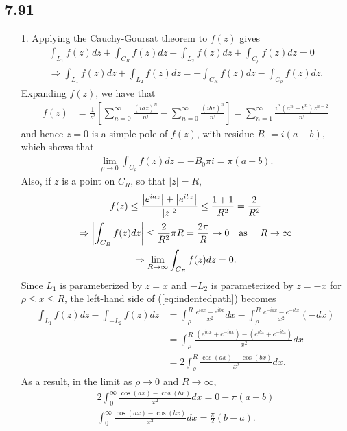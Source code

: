 \documentclass[a4paper,12pt]{article}
\begin{document}
\subsection*{7.91}
\begin{enumerate}
    \item[1.]
        Applying the Cauchy-Goursat theorem to $f(z)$ gives
        \begin{align}
            \int_{L_1} f(z) dz + \int_{C_R} f(z) dz + \int_{L_2} f(z) dz + \int_{C_\rho} f(z) dz = 0 \\
            \Rightarrow \int_{L_1} f(z) dz + \int_{L_2} f(z) dz = -\int_{C_R} f(z) dz - \int_{C_\rho} f(z) dz. \label{eq:indentedpath}
        \end{align}
        Expanding $f(z)$, we have that
        \begin{align*}
            f(z) &= \frac{1}{z^2} \left[ \sum_{n = 0}^\infty \frac{(iaz)^n}{n!} - \sum_{n = 0}^\infty \frac{(ibz)^n}{n!} \right] = \sum_{n = 1}^\infty \frac{i^n (a^n - b^n) z^{n - 2}}{n!}
        \end{align*}
        and hence $z = 0$ is a simple pole of $f(z)$, with residue $B_0 = i(a - b)$, which shows that
        \begin{align*}
            \lim_{\rho \to 0} \int_{C_\rho} f(z) dz = -B_0 \pi i = \pi(a - b).
        \end{align*}
        Also, if $z$ is a point on $C_R$, so that $|z| = R$,
        \begin{gather*}
            f(z) \leq \frac{\left| e^{iaz} \right| + \left| e^{ibz} \right|}{|z|^2} \leq \frac{1 + 1}{R^2} = \frac{2}{R^2} \\
            \Rightarrow \left| \int_{C_R} f(z) dz \right| \leq \frac{2}{R^2} \pi R = \frac{2 \pi}{R} \to 0 \text{\quad as \quad} R \to \infty \\
            \Rightarrow \lim_{R \to \infty} \int_{C_R} f(z) dz = 0.
        \end{gather*}
        Since $L_1$ is parameterized by $z = x$ and $-L_2$ is parameterized by $z = -x$ for $\rho \leq x \leq R$, the left-hand side of (\ref{eq:indentedpath}) becomes
        \begin{align*}
            \int_{L_1} f(z) dz - \int_{-L_2} f(z) dz &= \int_\rho^R \frac{e^{iax} - e^{ibx}}{x^2} dx - \int_\rho^R \frac{e^{-iax} - e^{-ibx}}{x^2} (-dx) \\
            &= \int_\rho^R \frac{\left( e^{iax} + e^{-iax} \right) - \left( e^{ibx} + e^{-ibx} \right)}{x^2} dx \\
            &= 2\int_\rho^R \frac{\cos(ax) - \cos(bx)}{x^2} dx.
        \end{align*}
        As a result, in the limit as $\rho \to 0$ and $R \to \infty$,
        \begin{gather*}
            2\int_0^\infty \frac{\cos(ax) - \cos(bx)}{x^2} dx = 0 - \pi(a - b) \\
            \int_0^\infty \frac{\cos(ax) - \cos(bx)}{x^2} dx = \frac{\pi}{2}(b - a).
        \end{gather*}


\end{enumerate}
\end{document}
